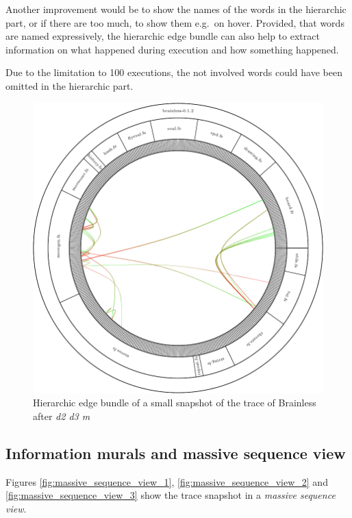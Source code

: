 Another improvement would be to show the names of the words in the hierarchic part, or if there are too much, to show them e.g.\ on hover.
Provided, that words are named expressively, the hierarchic edge bundle can also help to extract information on what happened during execution and how something happened. 

Due to the limitation to 100 executions, the not involved words could have been omitted in the hierarchic part.

\begin{figure}[p]
    \centering
    \includegraphics[scale=0.65]{graphics/hierarchic_edge_bundle-dir_file_word.png}
    \caption{Hierarchic edge bundle of a small snapshot of the trace of Brainless after \emph{d2 d3 m}}
    \label{fig:hierarchic_edge_bundle}
\end{figure}


\subsection*{Information murals and massive sequence view}

Figures \ref{fig:massive_sequence_view_1}, \ref{fig:massive_sequence_view_2} and \ref{fig:massive_sequence_view_3} show the trace snapshot in a \emph{massive sequence view}.

